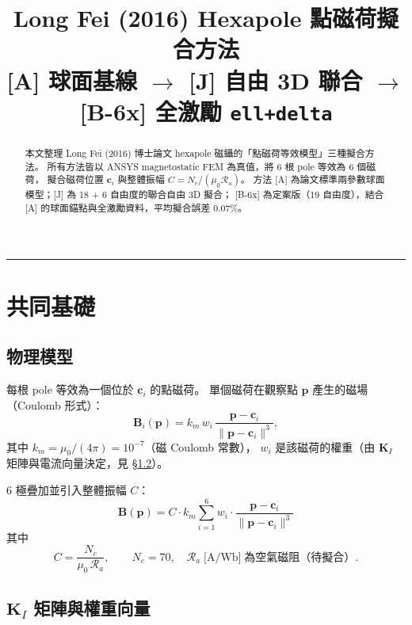 \documentclass[11pt,a4paper]{article}
\title{Long Fei (2016) Hexapole 點磁荷擬合方法\\
\large [A] 球面基線 \(\rightarrow\) [J] 自由 3D 聯合 \(\rightarrow\) [B-6x] 全激勵 \texttt{ell+delta}}
\author{}
\date{}
\newcommand{\mzero}{\mu_0}
\newcommand{\km}{k_m}
\newcommand{\Ra}{\mathcal{R}_a}
\newcommand{\Nc}{N_c}
\newcommand{\KI}{\mathbf{K}_I}
\newcommand{\bvec}{\mathbf{B}}
\newcommand{\pvec}{\mathbf{p}}
\newcommand{\cvec}{\mathbf{c}}
\begin{document}
\maketitle

\begin{abstract}
本文整理 Long Fei (2016) 博士論文 hexapole 磁鑷的「點磁荷等效模型」三種擬合方法。
所有方法皆以 ANSYS magnetostatic FEM 為真值，將 6 根 pole 等效為 6 個磁荷，
擬合磁荷位置 \(\cvec_i\) 與整體振幅 \(C = \Nc/(\mzero \Ra)\)。
方法 [A] 為論文標準兩參數球面模型；[J] 為 18 + 6 自由度的聯合自由 3D 擬合；
[B-6x] 為定案版（19 自由度），結合 [A] 的球面錨點與全激勵資料，平均擬合誤差 0.07\%。
\end{abstract}

\tableofcontents
\vspace{0.5em}\hrule\vspace{0.5em}

\section{共同基礎}

\subsection{物理模型}

每根 pole 等效為一個位於 \(\cvec_i\) 的點磁荷。
單個磁荷在觀察點 \(\pvec\) 產生的磁場（Coulomb 形式）：
\begin{equation}
\bvec_i(\pvec) = \km \, w_i \,
\frac{\pvec - \cvec_i}{\|\pvec - \cvec_i\|^3},
\end{equation}
其中 \(\km = \mzero/(4\pi) = 10^{-7}\)（磁 Coulomb 常數），
\(w_i\) 是該磁荷的權重（由 \(\KI\) 矩陣與電流向量決定，見 \S\ref{sec:KI}）。

6 極疊加並引入整體振幅 \(C\)：
\begin{equation}
\boxed{\;
\bvec(\pvec) = C \cdot \km \sum_{i=1}^{6}
w_i \cdot \frac{\pvec - \cvec_i}{\|\pvec - \cvec_i\|^3}
\;}
\label{eq:model}
\end{equation}
其中
\begin{equation}
C = \frac{\Nc}{\mzero \, \Ra},\qquad
\Nc = 70,\quad \Ra \;\text{[A/Wb]} \;\text{為空氣磁阻（待擬合）}.
\end{equation}

\subsection{\(\KI\) 矩陣與權重向量}\label{sec:KI}
\end{document}

